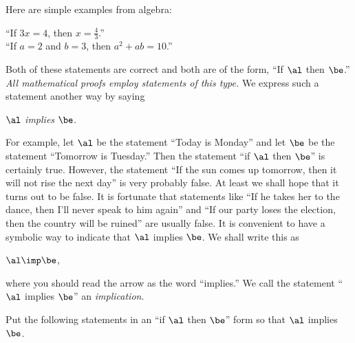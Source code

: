 \documentclass[11pt]{book}
\theoremstyle{bkplain}
\theoremstyle{XIplainnote}
\theoremstyle{bkplain}
\theoremstyle{bkplain}
\begin{document}
Here are simple examples from algebra:

\begin{center}
``If $3x = 4$, then $x = \tfrac{4}{3}$.''\\[2pt]
``If $a = 2$ and $b = 3$, then $a^2 + ab = 10$.''
\end{center}

Both of these statements are correct and both are of the form, ``If $\al$ then
$\be$.''
\emph{All mathematical proofs employ statements of this type.} We express such a
statement another way by saying

\begin{center}
$\al$ \emph{implies} $\be$.
\end{center}

For example, let $\al$ be the statement ``Today is Monday'' and let $\be$ be the
statement ``Tomorrow is Tuesday.'' Then the statement ``if $\al$ then $\be$'' is
certainly true. However, the statement ``If the sun comes up tomorrow, then it
will not rise the next day'' is very probably false. At least we shall hope that
it turns out to be false. It is fortunate that statements like ``If he takes her
to the dance, then I'll never speak to him again'' and ``If our party loses the
election, then the country will be ruined'' are usually false. It is convenient to
have a symbolic way to indicate that $\al$ implies $\be$. We shall write this as

\begin{center}
$\al \imp \be$,
\end{center}

\noindent where you should read the arrow as the word ``implies.'' We call the
statement ``$\al$ implies $\be$'' an \emph{implication}.


Put the following statements in an ``if $\al$ then $\be$'' form so that $\al$
implies $\be$.
\end{document}
